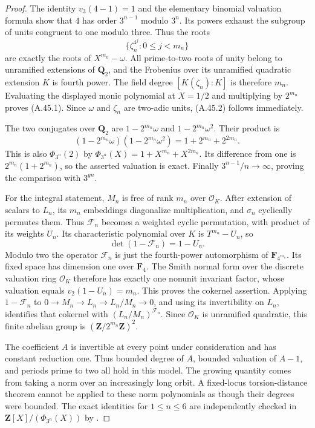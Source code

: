 \documentclass[11pt]{article}
\begin{document}
\begin{proof}
The identity $v_3(4-1)=1$ and the elementary binomial valuation formula
show that $4$ has order $3^{n-1}$ modulo $3^n$. Its powers exhaust
the subgroup of units congruent to one modulo three. Thus the roots
\[
 \{\zeta_n^{4^j}:0\le j<m_n\}
\]
are exactly the roots of $X^{m_n}-\omega$. All prime-to-two roots of
unity belong to unramified extensions of $\mathbf Q_2$, and the
Frobenius over its unramified quadratic extension $K$ is fourth
power. The field degree $[K(\zeta_n):K]$ is therefore $m_n$.
Evaluating the displayed monic polynomial at $X=1/2$ and multiplying
by $2^{m_n}$ proves (A.45.1). Since $\omega$ and $\zeta_n$ are
two-adic units, (A.45.2) follows immediately.

The two conjugates over $\mathbf Q_2$ are
$1-2^{m_n}\omega$ and $1-2^{m_n}\omega^2$. Their product is
\[
 (1-2^{m_n}\omega)(1-2^{m_n}\omega^2)
   =1+2^{m_n}+2^{2m_n}.
\]
This is also $\Phi_{3^n}(2)$ by
$\Phi_{3^n}(X)=1+X^{m_n}+X^{2m_n}$. Its difference from one
is $2^{m_n}(1+2^{m_n})$, so the asserted valuation is exact.
Finally $3^{n-1}/n\to\infty$, proving the comparison with $3^{gn}$.

For the integral statement, $M_n$ is free of rank $m_n$ over
$\mathcal O_K$. After extension of scalars to $L_n$, its $m_n$
embeddings diagonalize multiplication, and $\sigma_n$ cyclically
permutes them. Thus $\mathcal F_n$ becomes a weighted cyclic
permutation, with product of its weights $U_n$. Its characteristic
polynomial over $K$ is $T^{m_n}-U_n$, so
\[
                 \det(1-\mathcal F_n)=1-U_n.
\]
Modulo two the operator $\mathcal F_n$ is just the fourth-power
automorphism of $\mathbf F_{4^{m_n}}$. Its fixed space has dimension
one over $\mathbf F_4$. The Smith normal form over the discrete
valuation ring $\mathcal O_K$ therefore has exactly one nonunit
invariant factor, whose valuation equals $v_2(1-U_n)=m_n$.
This proves the cokernel assertion. Applying $1-\mathcal F_n$ to
$0\to M_n\to L_n\to L_n/M_n\to0$, and using its invertibility on
$L_n$, identifies that cokernel with $(L_n/M_n)^{\mathcal F_n}$.
Since $\mathcal O_K$ is unramified quadratic, this finite abelian
group is $(\mathbf Z/2^{m_n}\mathbf Z)^2$.

The coefficient $A$ is invertible at every point under consideration
and has constant reduction one. Thus bounded degree of $A$, bounded
valuation of $A-1$, and periods prime to two all hold in this model.
The growing quantity comes from taking a norm over an increasingly
long orbit. A fixed-locus torsion-distance theorem cannot be applied
to these norm polynomials as though their degrees were bounded.
The exact identities for $1\le n\le6$ are independently checked in
$\mathbf Z[X]/(\Phi_{3^n}(X))$ by
.
\end{proof}
\end{document}
